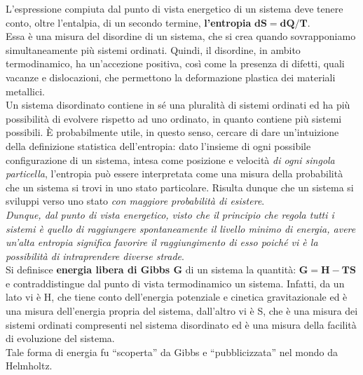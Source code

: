 L’espressione compiuta dal punto di vista energetico di un sistema deve tenere conto, oltre l’entalpia, di un secondo termine, \textbf{l’entropia} $\mathbf{dS=dQ/T}$.\\
Essa è una misura del disordine di un sistema, che si crea quando sovrapponiamo simultaneamente più sistemi ordinati. Quindi, il disordine, in ambito termodinamico, ha un’accezione positiva, così come la presenza di difetti, quali vacanze e dislocazioni, che permettono la deformazione plastica dei materiali metallici.\\
Un sistema disordinato contiene in sé una pluralità di sistemi ordinati ed ha più possibilità di evolvere rispetto ad uno ordinato, in quanto contiene più sistemi possibili. È probabilmente utile, in questo senso, cercare di dare un'intuizione della definizione statistica dell'entropia: dato l'insieme di ogni possibile configurazione di un sistema, intesa come posizione e velocità \textit{di ogni singola particella}, l'entropia può essere interpretata come una misura della probabilità che un sistema si trovi in uno stato particolare. Risulta dunque che un sistema si sviluppi verso uno stato \textit{con maggiore probabilità di esistere}.\\
\textit{Dunque, dal punto di vista energetico, visto che il principio che regola tutti i sistemi è quello di raggiungere spontaneamente il livello minimo di energia, avere un’alta entropia significa favorire il raggiungimento di esso poiché vi è la possibilità di intraprendere diverse strade}.\\
Si definisce \textbf{energia libera di Gibbs G} di un sistema la quantità: $\mathbf{G = H - TS}$ e contraddistingue dal punto di vista termodinamico un sistema. Infatti, da un lato vi è H, che tiene conto dell’energia potenziale e cinetica gravitazionale ed è una misura dell’energia propria del sistema, dall’altro vi è S, che è una misura dei sistemi ordinati compresenti nel sistema disordinato ed è una misura della facilità di evoluzione del sistema.\\
Tale forma di energia fu “scoperta” da Gibbs e “pubblicizzata” nel mondo da Helmholtz.

